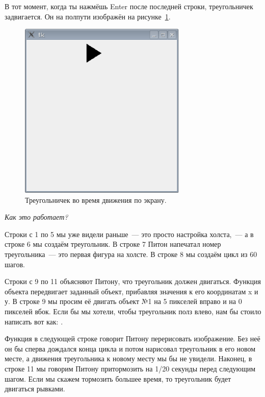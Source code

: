 В тот момент, когда ты нажмёшь Enter после последней строки, треугольничек задвигается. Он на полпути изображён на рисунке \ref{fig44}.

\begin{figure}
\begin{center}
\includegraphics[width=80mm]{../en/figure44.eps}
\end{center}
\caption{Треугольничек во время движения по экрану.}\label{fig44}
\end{figure}

\par
\emph{Как это работает?}
\par

Строки с 1 по 5 мы уже видели раньше — это просто настройка холста, — а в строке 6 мы создаём треугольник. В строке 7 Питон напечатал номер треугольника — это первая фигура на холсте. В строке 8 мы создаём цикл из 60 шагов.

Строки с 9 по 11 объясняют Питону, что треугольник должен двигаться. Функция  объекта  передвигает заданный объект, прибавляя значения к его координатам x и у. В строке 9 мы просим её двигать объект №1 на 5 пикселей вправо и на 0 пикселей вбок. Если бы мы хотели, чтобы треугольник полз влево, нам бы стоило написать вот как: .

Функция  в следующей строке говорит Питону перерисовать изображение. Без неё он бы сперва дождался конца цикла и потом нарисовал треугольник в его новом месте, а движения треугольника к новому месту мы бы не увидели. Наконец, в строке 11 мы говорим Питону притормозить на 1/20 секунды перед следующим шагом. Если мы скажем тормозить большее время, то треугольник будет двигаться рывками.


